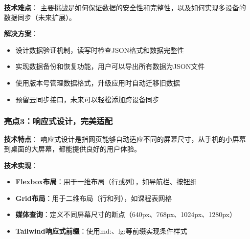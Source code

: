 \documentclass[12pt,a4paper]{article}
\begin{document}
\textbf{技术难点}：
主要挑战是如何保证数据的安全性和完整性，以及如何实现多设备的数据同步（未来扩展）。

\textbf{解决方案}：
\begin{itemize}
    \item 设计数据验证机制，读写时检查JSON格式和数据完整性
    \item 实现数据备份和恢复功能，用户可以导出所有数据为JSON文件
    \item 使用版本号管理数据格式，升级应用时自动迁移旧数据
    \item 预留云同步接口，未来可以轻松添加跨设备同步
\end{itemize}

\subsubsection{亮点3：响应式设计，完美适配}

\textbf{技术特点}：
响应式设计是指网页能够自动适应不同的屏幕尺寸，从手机的小屏幕到桌面的大屏幕，都能提供良好的用户体验。

\textbf{技术实现}：
\begin{itemize}
    \item \textbf{Flexbox布局}：用于一维布局（行或列），如导航栏、按钮组
    \item \textbf{Grid布局}：用于二维布局（行和列），如课程表网格
    \item \textbf{媒体查询}：定义不同屏幕尺寸的断点（640px、768px、1024px、1280px）
    \item \textbf{Tailwind响应式前缀}：使用md:、lg:等前缀实现条件样式
\end{itemize}
\end{document}
